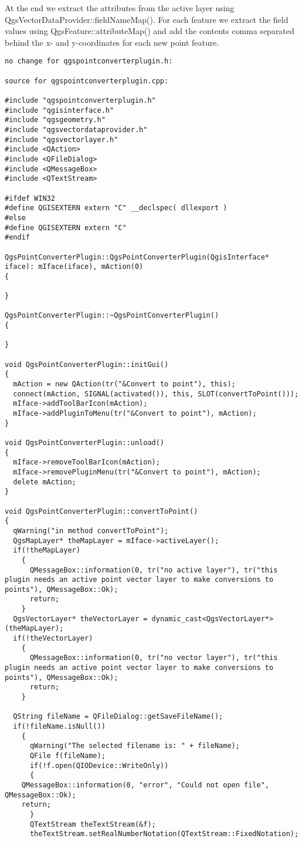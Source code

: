 
At the end we extract the attributes from the active layer using
QgsVectorDataProvider::fieldNameMap(). For each feature we extract the field
values using QgsFeature::attributeMap() and add the contents comma separated
behind the x- and y-coordinates for each new point feature.

\begin{verbatim}
no change for qgspointconverterplugin.h:

source for qgspointconverterplugin.cpp:

#include "qgspointconverterplugin.h"
#include "qgisinterface.h"
#include "qgsgeometry.h"
#include "qgsvectordataprovider.h"
#include "qgsvectorlayer.h"
#include <QAction>
#include <QFileDialog>
#include <QMessageBox>
#include <QTextStream>

#ifdef WIN32
#define QGISEXTERN extern "C" __declspec( dllexport )
#else
#define QGISEXTERN extern "C"
#endif

QgsPointConverterPlugin::QgsPointConverterPlugin(QgisInterface* iface): mIface(iface), mAction(0)
{

}

QgsPointConverterPlugin::~QgsPointConverterPlugin()
{

}

void QgsPointConverterPlugin::initGui()
{
  mAction = new QAction(tr("&Convert to point"), this);
  connect(mAction, SIGNAL(activated()), this, SLOT(convertToPoint()));
  mIface->addToolBarIcon(mAction);
  mIface->addPluginToMenu(tr("&Convert to point"), mAction);
}

void QgsPointConverterPlugin::unload()
{
  mIface->removeToolBarIcon(mAction);
  mIface->removePluginMenu(tr("&Convert to point"), mAction);
  delete mAction;
}

void QgsPointConverterPlugin::convertToPoint()
{
  qWarning("in method convertToPoint");
  QgsMapLayer* theMapLayer = mIface->activeLayer();
  if(!theMapLayer)
    {
      QMessageBox::information(0, tr("no active layer"), tr("this plugin needs an active point vector layer to make conversions to points"), QMessageBox::Ok);
      return;
    }
  QgsVectorLayer* theVectorLayer = dynamic_cast<QgsVectorLayer*>(theMapLayer);
  if(!theVectorLayer)
    {
      QMessageBox::information(0, tr("no vector layer"), tr("this plugin needs an active point vector layer to make conversions to points"), QMessageBox::Ok);
      return;
    }
  
  QString fileName = QFileDialog::getSaveFileName();
  if(!fileName.isNull())
    {
      qWarning("The selected filename is: " + fileName);
      QFile f(fileName);
      if(!f.open(QIODevice::WriteOnly))
      {
	QMessageBox::information(0, "error", "Could not open file", QMessageBox::Ok);
	return;
      }
      QTextStream theTextStream(&f);
      theTextStream.setRealNumberNotation(QTextStream::FixedNotation);


\end{verbatim}
